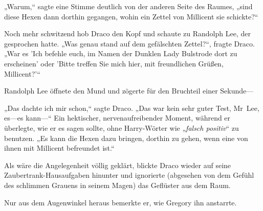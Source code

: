 „Warum,“ sagte eine Stimme deutlich von der anderen Seite des Raumes, „sind diese Hexen dann dorthin gegangen, wohin ein Zettel von Millicent sie schickte?“

Noch mehr schwitzend hob Draco den Kopf und schaute zu Randolph Lee, der gesprochen hatte. „Was genau stand auf dem gefälschten Zettel?“, fragte Draco. „War es 'Ich befehle euch, im Namen der Dunklen Lady Bulstrode dort zu erscheinen' oder 'Bitte treffen Sie mich hier, mit freundlichen Grüßen, Millicent?'“

Randolph Lee öffnete den Mund und zögerte für den Bruchteil einer Sekunde—

„Das dachte ich mir schon,“ sagte Draco. „Das war kein sehr guter Test, Mr~Lee, es—es kann—“ Ein hektischer, nervenaufreibender Moment, während er überlegte, wie er es sagen sollte, ohne Harry-Wörter wie „\emph{falsch positiv}“ zu benutzen. „Es kann die Hexen dazu bringen, dorthin zu gehen, wenn eine von ihnen mit Millicent befreundet ist.“

Als wäre die Angelegenheit völlig geklärt, blickte Draco wieder auf seine Zaubertrank-Hausaufgaben hinunter und ignorierte (abgesehen von dem Gefühl des schlimmen Grauens in seinem Magen) das Geflüster aus dem Raum.

Nur aus dem Augenwinkel heraus bemerkte er, wie Gregory ihn anstarrte.

\later

